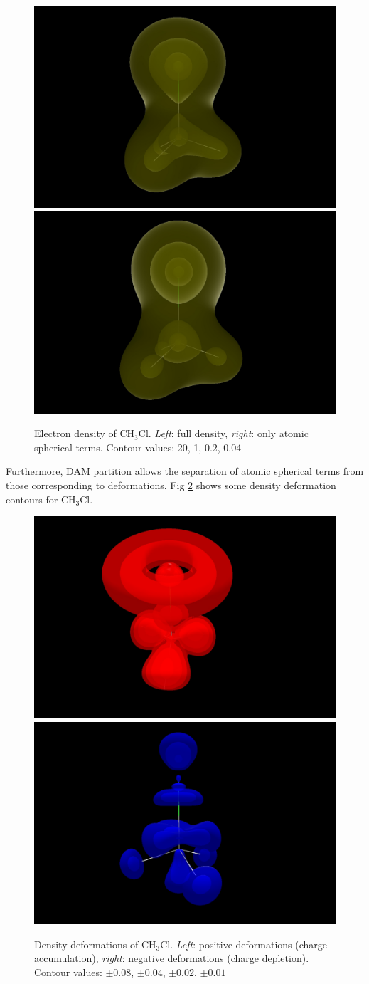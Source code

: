 \documentclass[10pt]{article}
\begin{document}
\begin{figure}[H]
\vspace*{-2mm}
\begin{center}
\includegraphics[width=.33\linewidth]{CH3Cl-QVTZ-d-tot.png}
\hspace*{5mm}
\includegraphics[width=.33\linewidth]{CH3Cl-QVTZ-d-l0.png}
\end{center}
\caption[Electron density of CH$_3$Cl]{ Electron density of CH$_3$Cl. {\it Left}: full density, {\it right}:
only atomic spherical terms. Contour values: 20, 1, 0.2, 0.04
\label{fig:6_1_1}}
\end{figure}

Furthermore, DAM partition allows the separation of atomic spherical terms
from those corresponding to deformations. Fig \ref{fig:6_1_2} shows some
density deformation contours for CH$_3$Cl.


\begin{figure}[H]
\vspace*{-2mm}
\begin{center}
\includegraphics[width=.33\linewidth]{CH3Cl-QVTZ-d-defpos.png}
\hspace*{5mm}
\includegraphics[width=.33\linewidth]{CH3Cl-QVTZ-d-defneg.png}
\vspace*{0.cm}
\end{center}
\caption[Density deformations of CH$_3$Cl]{ Density deformations of CH$_3$Cl. {\it Left}: positive deformations
(charge accumulation),
{\it right}: negative deformations (charge depletion). Contour values:
$\pm 0.08$, $\pm 0.04$, $\pm 0.02$, $\pm 0.01$
\label{fig:6_1_2}}
\end{figure}
\end{document}
